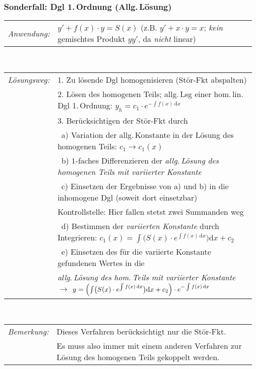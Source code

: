 \documentclass[a4paper,10pt,titlepage]{scrartcl}
\begin{document}
\subsubsection*{Sonderfall: Dgl 1.\,Ordnung (Allg.\,Lösung)}
\begin{tabular}{ll}
 \emph{Anwendung:}
 & $y'+f(x)\cdot y=S(x)$ \qquad (z.B. $y'+x\cdot y=x$; \emph{kein} gemischtes Produkt $yy'$, da \emph{nicht} linear)\\
\end{tabular}
\smallskip\\
\begin{tabular}{ll}
 \emph{Lösungsweg:}
 & 1. Zu lösende Dgl homogenisieren (Stör-Fkt abspalten)\\
 & 2. Lösen des homogenen Teils; allg.\,Lsg einer hom.\,lin.\,Dgl 1.\,Ordnung: $y_h=c_1\cdot e^{-\int f(x)\,\mathrm{d}x}$\\
 & 3. Berücksichtigen der Stör-Fkt durch\\
 & \quad\, a) Variation der allg.\,Konstante in der Lösung des homogenen Teils: $c_1\to c_1(x)$\\
 & \quad\, b) $1$-faches Differenzieren der \emph{allg.\,Lösung des homogenen Teils mit variierter Konstante}\\
 & \quad\, c) Einsetzen der Ergebnisse von a) und b) in die inhomogene Dgl (soweit dort einsetzbar)\\
 & \qquad\;   Kontrollstelle: Hier fallen stetst zwei Summanden weg\\
 & \quad\, d) Bestimmen der \emph{variierten Konstante} durch Integrieren: $c_1(x)=\int \bigl(S(x)\cdot e^{\int f(x)\,\mathrm{d}x}\bigr)\mathrm{d}x+c_2$\\
 & \quad\, e) Einsetzen des für die variierte Konstante gefundenen Wertes in die\\
 & \qquad\;   \emph{allg.\,Lösung des hom.\,Teils mit variierter Konstante} $\to$ $y=\Bigl(\int \bigl(S(x)\cdot e^{\int f(x)\,\mathrm{d}x}\bigr)\mathrm{d}x+c_2\Bigr)\cdot e^{-\int f(x)\,\mathrm{d}x}$\\
\end{tabular}
\medskip\\
\begin{tabular}{ll}
 \emph{Bemerkung:} & Dieses Verfahren berücksichtigt nur die Stör-Fkt.\\
 & Es muss also immer mit einem anderen Verfahren zur Lösung des homogenen Teils gekoppelt werden.\\
\end{tabular}
\end{document}
